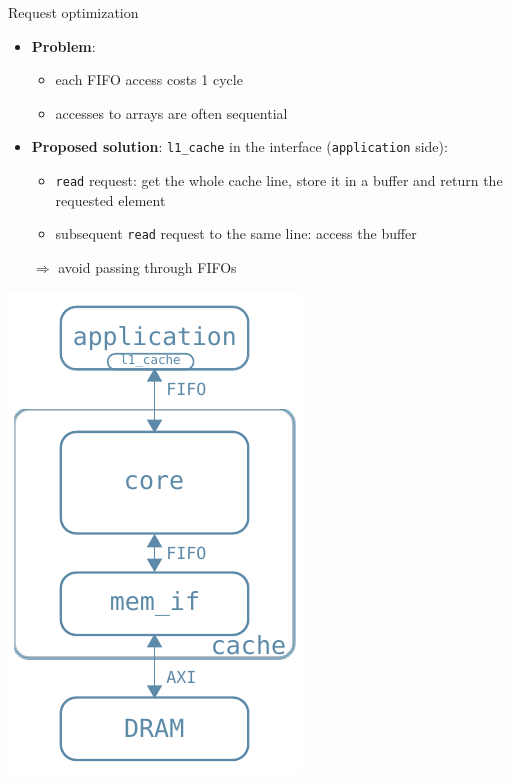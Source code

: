 \documentclass{beamer}
\begin{document}
\begin{frame}{Request optimization}
	\begin{minipage}{.7\textwidth}
		\begin{itemize}[<+->]
			\item \textbf{Problem}:
				\begin{itemize}[<.->]
					\item each FIFO access costs 1 cycle
					\item accesses to arrays are often sequential
				\end{itemize}
			\item \textbf{Proposed solution}:
				\texttt{l1\_cache} in the interface (\texttt{application}
				side):
				\begin{itemize}[<.->]
					\item \texttt{read} request:
						get the whole cache line, store it
						in a buffer and return the requested element
					\item subsequent \texttt{read} request to the same
						line: access the buffer
				\end{itemize}
			$\Rightarrow$ avoid passing through FIFOs
		\end{itemize}
	\end{minipage}
	\begin{minipage}{.28\textwidth}
		\begin{center}
			\includegraphics[width=.9\textwidth,height=.9\textheight,keepaspectratio]{l1_arch.pdf}

\end{center}
\end{minipage}
\end{frame}
\end{document}
